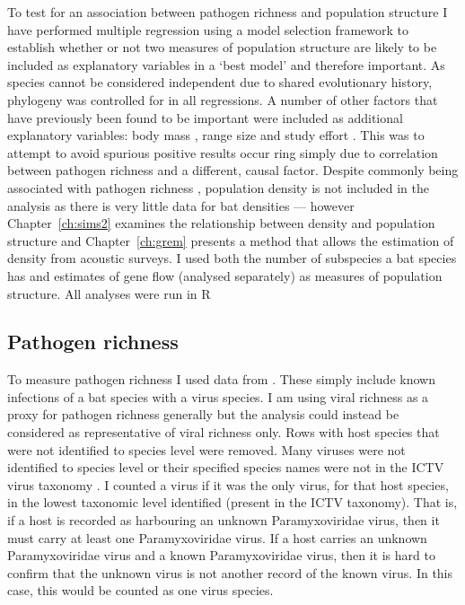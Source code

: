 To test for an association between pathogen richness and population structure I have performed multiple regression using a model selection framework to establish whether or not two measures of population structure are likely to be included as explanatory variables in a `best model' and therefore important.
As species cannot be considered independent due to shared evolutionary history, phylogeny was controlled for in all regressions.
A number of other factors that have previously been found to be important were included as additional explanatory variables: body mass \cite{kamiya2014determines, turmelle2009correlates, gay2014parasite, maganga2014bat, han2015infectious, bordes2008bat}, range size \cite{kamiya2014determines, turmelle2009correlates, maganga2014bat} and study effort \cite{turmelle2009correlates, gay2014parasite, maganga2014bat}.
This was to attempt to avoid spurious positive results occur  ring simply due to correlation between pathogen richness and a different, causal factor.
Despite commonly being associated with pathogen richness \cite{arneberg2002host, kamiya2014determines, nunn2003comparative}, population density is not included in the analysis as there is very little data for bat densities --- however Chapter~\ref{ch:sims2} examines the relationship between density and population structure and Chapter~\ref{ch:grem} presents a method that allows the estimation of density from acoustic surveys.
I used both the number of subspecies a bat species has and estimates of gene flow (analysed separately) as measures of population structure.
All analyses were run in R \cite{R}

\subsection{Pathogen richness}

To measure pathogen richness I used data from \cite{luis2013comparison}. 
These simply include known infections of a bat species with a virus species. 
I am using viral richness as a proxy for pathogen richness generally but the analysis could instead be considered as representative of viral richness only.
Rows with host species that were not identified to species level were removed.
Many viruses were not identified to species level or their specified species names were not in the ICTV virus taxonomy \cite{ICTV}.
I counted a virus if it was the only virus, for that host species, in the lowest taxonomic level identified (present in the ICTV taxonomy).
That is, if a host is recorded as harbouring an unknown Paramyxoviridae virus, then it must carry at least one Paramyxoviridae virus.
If a host carries an unknown Paramyxoviridae virus and a known Paramyxoviridae virus, then it is hard to confirm that the unknown virus is not another record of the known virus.
In this case, this would be counted as one virus species.






